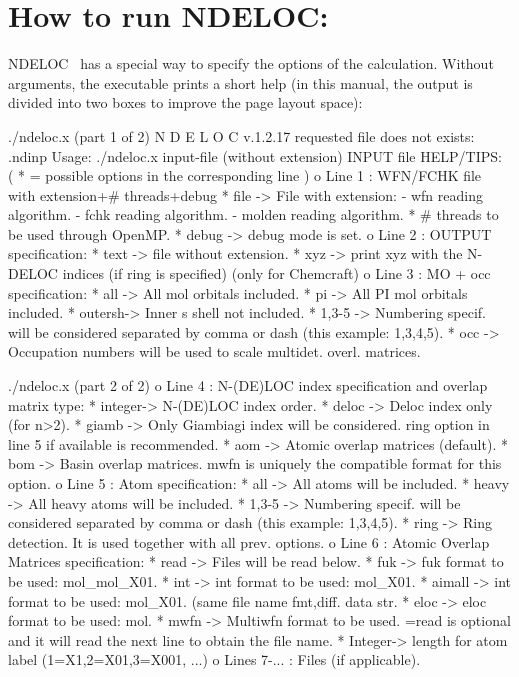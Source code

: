\documentclass[a4paper,11pt,openany]{memoir}
\newcommand\programa{\textsc{NDELOC}}
\begin{document}
\chapter{How to run \programa:}\label{chap:run}
\programa~ has a special way to specify the options of the calculation. Without arguments, the executable prints a short help (in this manual, the output is divided into two boxes to improve the page layout space):
\begin{consola}{./ndeloc.x   (part 1 of 2)}
		N D E L O C  v.1.2.17
requested file does not exists: .ndinp
Usage: ./ndeloc.x input-file (without extension)
INPUT file HELP/TIPS:
( * = possible options in the corresponding line )
o Line 1 :  WFN/FCHK file with extension+# threads+debug
 *  file   -> File with extension:
  - wfn    reading algorithm.        
  - fchk   reading algorithm.        
  - molden reading algorithm.        
 *  # threads to be used through OpenMP.
 *  debug  -> debug mode is set.
o Line 2 :  OUTPUT          specification:
 *  text   -> file without extension.
 *  xyz    -> print xyz with the N-DELOC indices (if ring is specified) (only for Chemcraft)
o Line 3 :  MO + occ        specification:
 *  all    -> All mol orbitals included.
 *  pi     -> All PI mol orbitals included.
 *  outersh-> Inner s shell not included.
 *  1,3-5  -> Numbering specif. will be considered separated by comma or dash
              (this example: 1,3,4,5).
 *  occ    -> Occupation numbers will be used to scale multidet. overl. matrices.
\end{consola}
\begin{consola}{./ndeloc.x   (part 2 of 2)}
o Line 4 :  N-(DE)LOC index specification and overlap matrix type:
 *  integer-> N-(DE)LOC index order.
 *  deloc  -> Deloc index only (for n>2).
 *  giamb  -> Only Giambiagi index will be considered. ring option in line 5 if available
              is recommended.
 *  aom    -> Atomic overlap matrices (default).
 *  bom    -> Basin  overlap matrices. mwfn is uniquely the compatible format for 
              this option.
o Line 5 :  Atom specification:
 *  all    -> All atoms will be included.
 *  heavy  -> All heavy atoms will be included.
 *  1,3-5  -> Numbering specif. will be considered separated by comma or dash
              (this example: 1,3,4,5).
 *  ring   -> Ring detection. It is used together with all prev. options.
o Line 6 :  Atomic Overlap Matrices specification:
 *  read   -> Files will be read below.
 *  fuk    -> fuk format to be used: mol_mol_X01.
 *  int    -> int format to be used: mol_X01.
 *  aimall -> int format to be used: mol_X01. (same file name fmt,diff. data str.
 *  eloc   -> eloc format to be used: mol.
 *  mwfn   -> Multiwfn format to be used. =read is optional and it will read 
              the next line to obtain the file name.                              
 *  Integer-> length for atom label (1=X1,2=X01,3=X001, ...)
o Lines 7-... :  Files (if applicable).
\end{consola}
\end{document}
